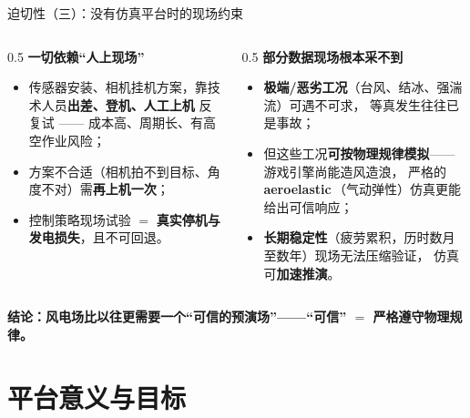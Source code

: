 \documentclass[aspectratio=169,10pt,UTF8]{ctexbeamer}
\newcommand{\hl}[1]{{\color{myblue}\bfseries #1}}
\newcommand{\hlr}[1]{{\color{myred}\bfseries #1}}
\newcommand{\term}[2]{\textbf{#1}\,（#2）}
\begin{document}
\begin{frame}{迫切性（三）：没有仿真平台时的现场约束}
  \begin{columns}[T]
    \begin{column}{0.5\textwidth}
      \textbf{一切依赖“人上现场”}
      \begin{itemize}\small
        \item 传感器安装、相机挂机方案，靠技术人员\hlr{出差、登机、人工上机}
              反复试 —— 成本高、周期长、有高空作业风险；
        \item 方案不合适（相机拍不到目标、角度不对）需\textbf{再上机一次}；
        \item 控制策略现场试验 $=$ \hlr{真实停机与发电损失}，且不可回退。
      \end{itemize}
    \end{column}
    \begin{column}{0.5\textwidth}
      \textbf{部分数据现场根本采不到}
      \begin{itemize}\small
        \item \hlr{极端/恶劣工况}（台风、结冰、强湍流）可遇不可求，
              等真发生往往已是事故；
        \item 但这些工况\hl{可按物理规律模拟}——游戏引擎尚能造风造浪，
              严格的 \term{aeroelastic}{气动弹性}仿真更能给出可信响应；
        \item \hlr{长期稳定性}（疲劳累积，历时数月至数年）现场无法压缩验证，
              仿真可\textbf{加速推演}。
      \end{itemize}
    \end{column}
  \end{columns}
  \vfill
  \begin{center}
    \hl{结论：风电场比以往更需要一个“可信的预演场”——“可信” $=$ 严格遵守物理规律。}
  \end{center}
\end{frame}

\section{平台意义与目标}
\end{document}
